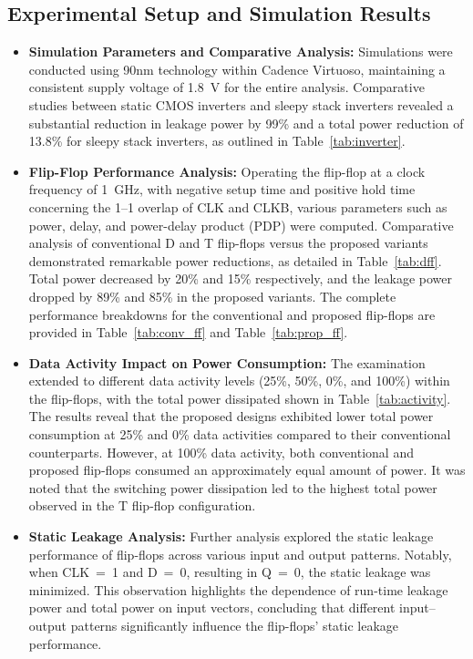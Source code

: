 \documentclass[conference]{IEEEtran}
\begin{document}
\subsection{Experimental Setup and Simulation Results}

\begin{itemize}
	\item \textbf{Simulation Parameters and Comparative Analysis:} Simulations were conducted using 90nm technology within Cadence Virtuoso, maintaining a consistent supply voltage of 1.8~V for the entire analysis. Comparative studies between static CMOS inverters and sleepy stack inverters revealed a substantial reduction in leakage power by 99\% and a total power reduction of 13.8\% for sleepy stack inverters, as outlined in Table~\ref{tab:inverter}.
	\item \textbf{Flip-Flop Performance Analysis:} Operating the flip-flop at a clock frequency of 1~GHz, with negative setup time and positive hold time concerning the 1--1 overlap of CLK and CLKB, various parameters such as power, delay, and power-delay product (PDP) were computed.
    Comparative analysis of conventional D and T flip-flops versus the proposed variants demonstrated remarkable power reductions, as detailed in Table~\ref{tab:dff}. Total power decreased by 20\% and 15\% respectively, and the leakage power dropped by 89\% and 85\% in the proposed variants. The complete performance breakdowns for the conventional and proposed flip-flops are provided in Table~\ref{tab:conv_ff} and Table~\ref{tab:prop_ff}.
    \item \textbf{Data Activity Impact on Power Consumption:} The examination extended to different data activity levels (25\%, 50\%, 0\%, and 100\%) within the flip-flops, with the total power dissipated shown in Table~\ref{tab:activity}. The results reveal that the proposed designs exhibited lower total power consumption at 25\% and 0\% data activities compared to their conventional counterparts.
    However, at 100\% data activity, both conventional and proposed flip-flops consumed an approximately equal amount of power. It was noted that the switching power dissipation led to the highest total power observed in the T flip-flop configuration.
	\item \textbf{Static Leakage Analysis:} Further analysis explored the static leakage performance of flip-flops across various input and output patterns. Notably, when CLK~=~1 and D~=~0, resulting in Q~=~0, the static leakage was minimized. This observation highlights the dependence of run-time leakage power and total power on input vectors, concluding that different input--output patterns significantly influence the flip-flops' static leakage performance.
\end{itemize}
\end{document}
